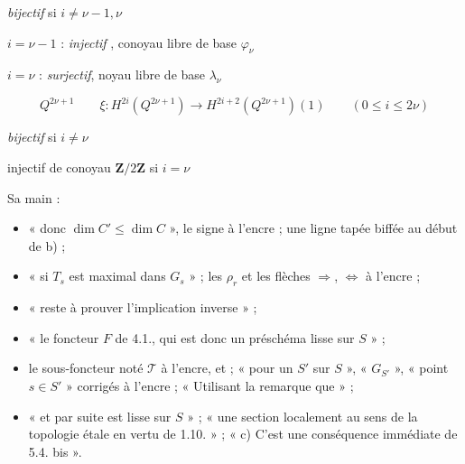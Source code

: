 \documentclass[11pt,a4paper]{article}
\begin{document}
\emph{bijectif} si $i \neq \nu - 1, \nu$

$i = \nu - 1$ : \emph{injectif} , conoyau libre de base
$\varphi_{\nu}$

$i = \nu$ :  \emph{surjectif}, noyau libre de base
$\lambda_{\nu}$

\[
  Q^{2\nu+1} \qquad \xi : H^{2i}(Q^{2\nu+1}) \to H^{2i+2}(Q^{2\nu+1})(1)
  \qquad (0 \leqslant i \leqslant 2\nu)
\]

\emph{bijectif} si $i \neq \nu$

injectif de conoyau $\mathbf{Z}/2\mathbf{Z}$ si $i = \nu$



Sa main :
\begin{itemize}
  \item « donc $\dim C' \leqslant \dim C$ », le signe à l'encre ; une ligne tapée
  biffée au début de b) ;
  \item « si $T_s$ est  maximal dans $G_s$ » ; les $\rho_r$ et les
  flèches $\Rightarrow$, $\Leftrightarrow$ à l'encre ;
  \item « reste à prouver l'implication inverse  » ;
  \item « le foncteur $F$ de  4.1., qui est donc un préschéma
  \struck{\ill{}} lisse  sur $S$ » ;
  \item le sous-foncteur noté $\mathcal{T}$ à l'encre, et
   ;
  « pour un $S'$ sur $S$ », « $G_{S'}$ », « point $s \in S'$ » corrigés à
  l'encre ; « Utilisant la remarque que » ;
  \item « et par suite est lisse  sur $S$ » ; « une section
   localement au sens de la topologie étale en vertu de
   1.10. » ; « c) C'est une conséquence immédiate de 
  5.4. bis ».
\end{itemize}
\end{document}
